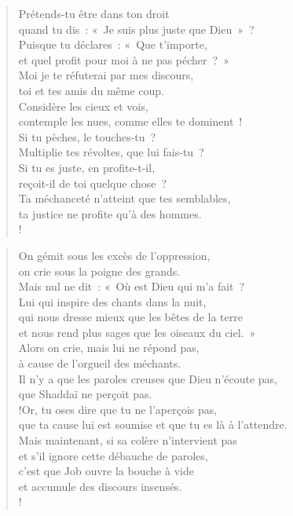\documentclass[french,twoside]{book} %
\def\mednobreak{\ifdim\lastskip<\medskipamount
  \removelastskip\nopagebreak\medskip\fi}
\newcommand{\labelblock}[1]{\medbreak{\noindent\color{rubric}\bfseries #1}\par\mednobreak}
\newcommand\chapterclose{} %
\begin{document}
\begin{verse}
Prétends-tu être dans ton droit \\
quand tu dis : « Je suis plus juste que Dieu » ?\\
Puisque tu déclares : « Que t’importe, \\
et quel profit pour moi à ne pas pécher ? »\\
Moi je te réfuterai par mes discours, \\
toi et tes amis du même coup.\\
Considère les cieux et vois, \\
contemple les nues, comme elles te dominent !\\
Si tu pèches, le touches-tu ? \\
Multiplie tes révoltes, que lui fais-tu ?\\
Si tu es juste, en profite-t-il, \\
reçoit-il de toi quelque chose ?\\
Ta méchanceté n’atteint que tes semblables, \\
ta justice ne profite qu’à des hommes.\\!
\end{verse}

\labelblock{Les chants dans la nuit}


\begin{verse}
On gémit sous les excès de l’oppression, \\
on crie sous la poigne des grands.\\
Mais nul ne dit : « Où est Dieu qui m’a fait ? \\
Lui qui inspire des chants dans la nuit,\\
qui nous dresse mieux que les bêtes de la terre \\
et nous rend plus sages que les oiseaux du ciel. »\\
Alors on crie, mais lui ne répond pas, \\
à cause de l’orgueil des méchants.\\
Il n’y a que les paroles creuses que Dieu n’écoute pas, \\
que Shaddaï ne perçoit pas.\\!Or, tu oses dire que tu ne l’aperçois pas, \\
que ta cause lui est soumise et que tu es là à l’attendre.\\
Mais maintenant, si sa colère n’intervient pas \\
et s’il ignore cette débauche de paroles,\\
c’est que Job ouvre la bouche à vide \\
et accumule des discours insensés.\\!
\end{verse}
\chapterclose
\end{document}
